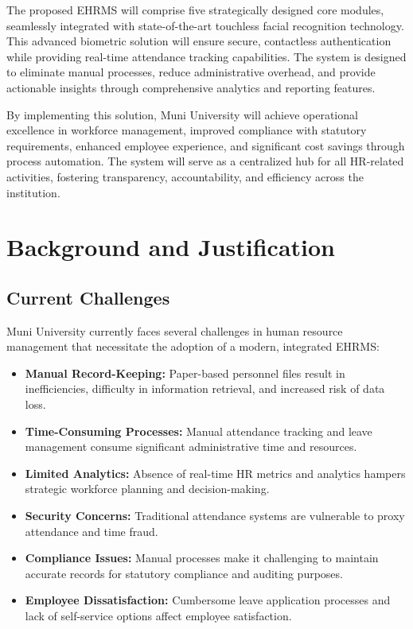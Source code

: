\documentclass[12pt]{article}
\begin{document}
The proposed EHRMS will comprise five strategically designed core modules, seamlessly integrated with state-of-the-art touchless facial recognition technology. This advanced biometric solution will ensure secure, contactless authentication while providing real-time attendance tracking capabilities. The system is designed to eliminate manual processes, reduce administrative overhead, and provide actionable insights through comprehensive analytics and reporting features.

By implementing this solution, Muni University will achieve operational excellence in workforce management, improved compliance with statutory requirements, enhanced employee experience, and significant cost savings through process automation. The system will serve as a centralized hub for all HR-related activities, fostering transparency, accountability, and efficiency across the institution.

\section{Background and Justification}

\subsection{Current Challenges}

Muni University currently faces several challenges in human resource management that necessitate the adoption of a modern, integrated EHRMS:

\begin{itemize}[noitemsep]
\item \textbf{Manual Record-Keeping:} Paper-based personnel files result in inefficiencies, difficulty in information retrieval, and increased risk of data loss.
\item \textbf{Time-Consuming Processes:} Manual attendance tracking and leave management consume significant administrative time and resources.
\item \textbf{Limited Analytics:} Absence of real-time HR metrics and analytics hampers strategic workforce planning and decision-making.
\item \textbf{Security Concerns:} Traditional attendance systems are vulnerable to proxy attendance and time fraud.
\item \textbf{Compliance Issues:} Manual processes make it challenging to maintain accurate records for statutory compliance and auditing purposes.
\item \textbf{Employee Dissatisfaction:} Cumbersome leave application processes and lack of self-service options affect employee satisfaction.
\end{itemize}
\end{document}
